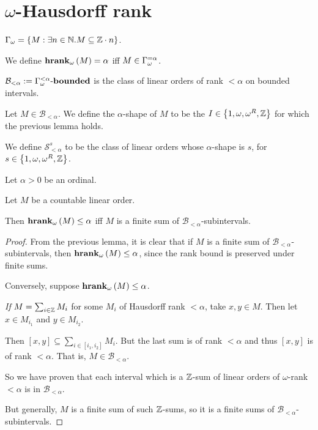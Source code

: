 

\section{$\omega$-Hausdorff rank}

\begin{definitions}
  $\Gamma_{\omega} = \left\{ {M : \exists n \in \mathbb{N} . M \subseteq \mathbb{Z} \cdot n} \right\}$.

  We define $\mathbf{hrank}_{\omega}\left( M \right) = \alpha$ iff $M \in \Gamma_{\omega}^{= \alpha}$.

  $\mathcal{B}_{< \alpha} := {\Gamma_{\omega}^{< \alpha}} \text{-} \mathbf{bounded}$ is the class
  of linear orders of rank $< \alpha$ on bounded intervals.
\end{definitions}


\begin{definition}
  Let $M \in \mathcal{B}_{< \alpha}$. We define the $\alpha$-shape
  of $M$ to be the $I \in \left\{ {1, \omega, \omega^R, \mathbb{Z}} \right\}$ 
  for which the previous lemma holds.

  We define $\mathcal{S}^{s}_{< \alpha}$ to be the class of linear orders
  whose $\alpha$-shape is $s$, for $s \in \left\{ {1, \omega, \omega^R, \mathbb{Z}} \right\}$.
\end{definition}

\begin{lemma}
  Let $\alpha > 0$ be an ordinal.

  Let $M$ be a countable linear order.

  Then $\mathbf{hrank}_{\omega}\left( M \right) \le \alpha$ iff $M$ is a finite sum of $\mathcal{B}_{< \alpha}$-subintervals.
\end{lemma}

\begin{proof}
  From the previous lemma, it is clear that if $M$ is a finite sum of $\mathcal{B}_{< \alpha}$-subintervals,
  then $\mathbf{hrank}_{\omega}\left( M \right) \le \alpha$, since the rank bound is preserved under finite sums.

  Conversely, suppose $\mathbf{hrank}_{\omega}\left( M \right) \le \alpha$.

  \emph{If} $M = \sum_{i \in \mathbb{Z}} M_i$ for some $M_i$ of Hausdorff rank $< \alpha$,
  take $x, y \in M$. Then let $x \in M_{i_1}$ and $y \in M_{i_2}$.

  Then $[x, y] \subseteq \sum_{i \in [i_1, i_2]} M_i$. But the last sum is of rank $< \alpha$
  and thus $[x, y]$ is of rank $< \alpha$. That is, $M \in \mathcal{B}_{< \alpha}$.

  So we have proven that each interval which is a $\mathbb{Z}$-sum of linear orders of
  $\omega$-rank $< \alpha$ is in $\mathcal{B}_{< \alpha}$.

  But generally, $M$ is a finite sum of such $\mathbb{Z}$-sums, so it is a finite sums
  of $\mathcal{B}_{< \alpha}$-subintervals.
\end{proof}

